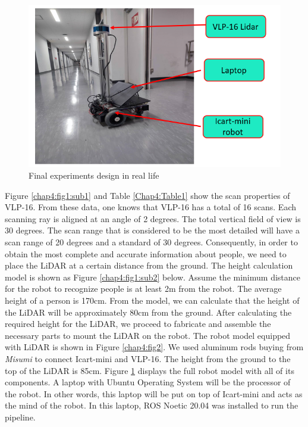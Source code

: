 \begin{figure}[h]
    \centering
    \includegraphics[width=1.0\linewidth]{figures/chap4_fig/Platform/icart_mini_with_lidar.png}
    \caption{Final experiments design in real life}
    \label{Chap4:fig3}
\end{figure}

Figure \ref{chap4:fig1:sub1} and Table \ref{Chap4:Table1}  show the scan properties of 
VLP-16. From these data, one knows that VLP-16 has a total of 16 scans. Each scanning 
ray is aligned at an angle of 2 degrees. The total vertical field of view is 30 degrees. 
The scan range that is considered to be the most detailed will have a scan range of 20 
degrees and a standard of 30 degrees. Consequently, in order to obtain the most complete 
and accurate information about people, we need to place the LiDAR at a certain distance 
from the ground. The height calculation model is shown as Figure \ref{chap4:fig1:sub2} 
below. Assume the minimum distance for the robot to recognize people is at least 2m from 
the robot. The average height of a person is 170cm. From the model, we can calculate 
that the height of the LiDAR will be approximately 80cm from the ground. 
After calculating the required height for the LiDAR, we proceed to fabricate and 
assemble the necessary parts to mount the LiDAR on the robot. The robot model equipped 
with LiDAR is shown in Figure \ref{chap4:fig2}. We used aluminum rods buying from \textit{Misumi}
to connect Icart-mini and VLP-16. The height from the ground to the top of the LiDAR is 
85cm. Figure \ref{Chap4:fig3} displays the full robot model with all of its components. 
A laptop with Ubuntu Operating System will be the processor of the robot. 
In other words, this laptop will be put on top of Icart-mini and acts as the mind of 
the robot. In this laptop, ROS Noetic 20.04 was installed to run the pipeline.


